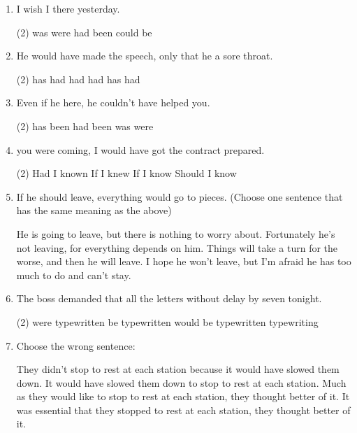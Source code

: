 \begin{enumerate}
\item I wish I \ttu there yesterday.
  \begin{tasks}(2)
    \task was
    \task were
    \task had been
    \task could be
  \end{tasks}

\item He would have made the speech, only that he \ttu a sore throat.
  \begin{tasks}(2)
    \task has
    \task had
    \task had had
    \task has had
  \end{tasks}

\item Even if he \ttu here, he couldn't have helped you.
  \begin{tasks}(2)
    \task has been
    \task had been
    \task was
    \task were
  \end{tasks}

\item \ttu you were coming, I would have got the contract prepared.
  \begin{tasks}(2)
    \task Had I known
    \task If I knew
    \task If I know
    \task Should I know
  \end{tasks}

\item If he should leave, everything would go to pieces. (Choose one sentence that has the same meaning as the above)
  \begin{tasks}
    \task He is going to leave, but there is nothing to worry about.
    \task Fortunately he's not leaving, for everything depends on him.
    \task Things will take a turn for the worse, and then he will leave.
    \task I hope he won't leave, but I'm afraid he has too much to do and can't stay.
  \end{tasks}

\item The boss demanded that all the letters \ttu without delay by seven tonight.
  \begin{tasks}(2)
    \task were typewritten
    \task be typewritten
    \task would be typewritten
    \task typewriting
  \end{tasks}

\item Choose the wrong sentence:
  \begin{tasks}
    \task They didn't stop to rest at each station because it would have slowed them down.
    \task It would have slowed them down to stop to rest at each station.
    \task Much as they would like to stop to rest at each station, they thought better of it.
    \task It was essential that they stopped to rest at each station, they thought better of it.
  \end{tasks}


\end{enumerate}
